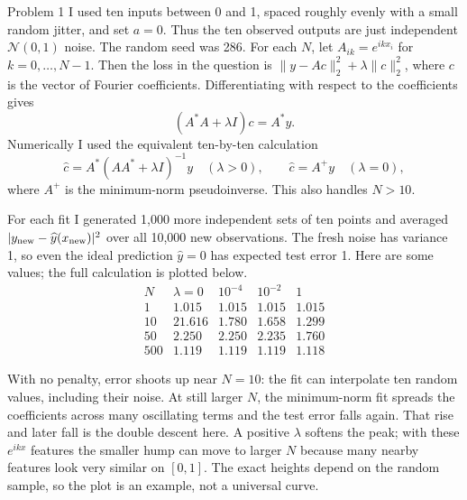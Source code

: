 \documentclass[12pt,a4paper]{article}
\begin{document}
\begin{solution}{Problem 1}
I used ten inputs between 0 and 1, spaced roughly evenly with a small random
jitter, and set $a=0$. Thus the ten observed outputs are just independent
$\mathcal N(0,1)$ noise. The random seed was 286. For each $N$, let
$A_{ik}=e^{ikx_i}$ for $k=0,\ldots,N-1$. Then the loss in the question is
$\|y-Ac\|_2^2+\lambda\|c\|_2^2$, where $c$ is the vector of Fourier
coefficients. Differentiating with respect to the coefficients gives
\[
  (A^*A+\lambda I)c=A^*y.
\]
Numerically I used the equivalent ten-by-ten calculation
\[
  \widehat c=A^*(AA^*+\lambda I)^{-1}y \quad(\lambda>0),
  \qquad \widehat c=A^+y\quad(\lambda=0),
\]
where $A^+$ is the minimum-norm pseudoinverse. This also handles $N>10$.

For each fit I generated 1,000 more independent sets of ten points and
averaged $|y_{\rm new}-\widehat y(x_{\rm new})|^2$ over all 10,000 new
observations. The fresh noise has variance 1, so even the ideal prediction
$\widehat y=0$ has expected test error 1. Here are some values; the full
calculation is plotted below.
\[
\begin{array}{c|rrrr}
N & \lambda=0 & 10^{-4} & 10^{-2} & 1\\\hline
1   &1.015&1.015&1.015&1.015\\
10  &21.616&1.780&1.658&1.299\\
50  &2.250&2.250&2.235&1.760\\
500 &1.119&1.119&1.119&1.118
\end{array}
\]
\begin{center}
\end{center}
With no penalty, error shoots up near $N=10$: the fit can interpolate ten
random values, including their noise. At still larger $N$, the minimum-norm
fit spreads the coefficients across many oscillating terms and the test error
falls again. That rise and later fall is the double descent here. A positive
$\lambda$ softens the peak; with these $e^{ikx}$ features the smaller hump can
move to larger $N$ because many nearby features look very similar on $[0,1]$.
The exact heights depend on the random sample, so the plot is an example,
not a universal curve.
\end{solution}
\end{document}
